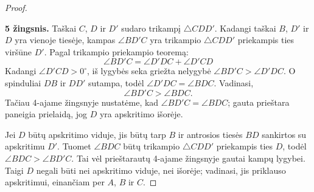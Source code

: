 \documentclass[11pt,a4paper]{scrartcl}
\begin{document}
\begin{proof}
\begin{center}
\end{center}
\textbf{5 žingsnis.} Taškai $C$, $D$ ir $D'$ sudaro trikampį $\triangle CDD'$. Kadangi taškai $B$, $D'$ ir $D$ yra vienoje tiesėje, kampas $\angle BD'C$ yra trikampio $\triangle CDD'$ priekampis ties viršūne $D'$. Pagal trikampio priekampio teoremą:
\begin{equation*}
\angle BD'C = \angle D'DC + \angle D'CD
\end{equation*}
Kadangi $\angle D'CD>0^\circ$, iš lygybės seka griežta nelygybė $\angle BD'C>\angle D'DC$. O spinduliai $DB$ ir $DD'$ sutampa, todėl $\angle D'DC=\angle BDC$. Vadinasi,
\begin{equation*}
\angle BD'C > \angle BDC.
\end{equation*}
Tačiau 4-ajame žingsnyje nustatėme, kad $\angle BD'C=\angle BDC$; gauta prieštara paneigia prielaidą, jog $D$ yra apskritimo išorėje.

Jei $D$ būtų apskritimo viduje, jis būtų tarp $B$ ir antrosios tiesės $BD$ sankirtos su apskritimu $D'$. Tuomet $\angle BDC$ būtų trikampio $\triangle CDD'$ priekampis ties $D$, todėl $\angle BDC>\angle BD'C$. Tai vėl prieštarautų 4-ajame žingsnyje gautai kampų lygybei. Taigi $D$ negali būti nei apskritimo viduje, nei išorėje; vadinasi, jis priklauso apskritimui, einančiam per $A$, $B$ ir $C$.
\end{proof}
\end{document}

